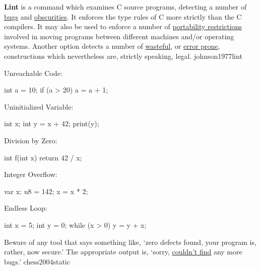 \documentclass{article}
\begin{document}

  {\textbf{Lint} is a command which examines C source programs, detecting a number of \ul{bugs} and \ul{obscurities}. It enforces the type rules of C more strictly than the C compilers. It may also be used to enforce a number of \ul{portability restrictions} involved in moving programs between different machines and/or operating systems. Another option detects a number of \ul{wasteful}, or \ul{error prone}, constructions which nevertheless are, strictly speaking, legal.}
  {johnson1977lint}



\begin{pptWide}{3}
Unreachable Code:
{\small\begin{ffcode}
int a = 10;
if (a > 20) {
  a = a + 1;
}
\end{ffcode}
}\par
Uninitialized Variable:\par
{\small\begin{ffcode}
int x;
int y = x + 42;
print(y);
\end{ffcode}
}

\par\columnbreak\par
Division by Zero:\par
{\small\begin{ffcode}
int f(int x) {
  return 42 / x;
}
\end{ffcode}
}\par
Integer Overflow:\par
{\small\begin{ffcode}
var x: u8 = 142;
x = x * 2;
\end{ffcode}
}
\par\columnbreak\par
Endless Loop:
{\small\begin{ffcode}
int x = 5;
int y = 0;
while (x > 0) {
  y = y + x;
}
\end{ffcode}
}
\end{pptWide}
\plush{}

  {Beware of any tool that says something like, `zero defects found, your program is, rather, now secure.' The appropriate output is, `sorry, \ul{couldn’t find} any more bugs.'}
  {chess2004static}
\end{document}
